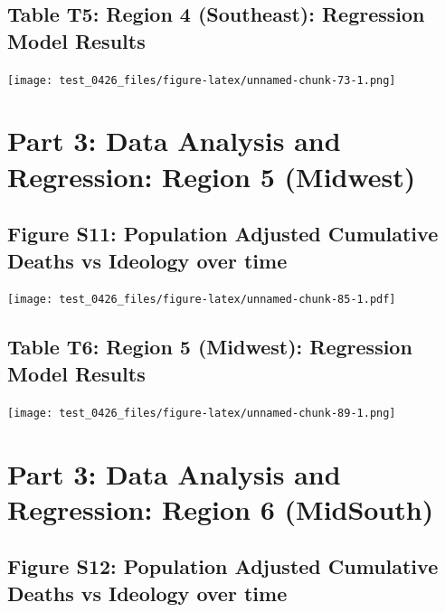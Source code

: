 \documentclass[
]{article}
\begin{document}
\hypertarget{table-t5-region-4-southeast-regression-model-results}{%
\subsection{Table T5: Region 4 (Southeast): Regression Model
Results}\label{table-t5-region-4-southeast-regression-model-results}}

\texttt{[image: test\_0426\_files/figure-latex/unnamed-chunk-73-1.png]}

\newpage

\hypertarget{part-3-data-analysis-and-regression-region-5-midwest}{%
\section{Part 3: Data Analysis and Regression: Region 5
(Midwest)}\label{part-3-data-analysis-and-regression-region-5-midwest}}

\hypertarget{figure-s11-population-adjusted-cumulative-deaths-vs-ideology-over-time}{%
\subsection{Figure S11: Population Adjusted Cumulative Deaths vs
Ideology over
time}\label{figure-s11-population-adjusted-cumulative-deaths-vs-ideology-over-time}}

\texttt{[image: test\_0426\_files/figure-latex/unnamed-chunk-85-1.pdf]}

\hypertarget{table-t6-region-5-midwest-regression-model-results}{%
\subsection{Table T6: Region 5 (Midwest): Regression Model
Results}\label{table-t6-region-5-midwest-regression-model-results}}

\texttt{[image: test\_0426\_files/figure-latex/unnamed-chunk-89-1.png]}

\newpage

\hypertarget{part-3-data-analysis-and-regression-region-6-midsouth}{%
\section{Part 3: Data Analysis and Regression: Region 6
(MidSouth)}\label{part-3-data-analysis-and-regression-region-6-midsouth}}

\hypertarget{figure-s12-population-adjusted-cumulative-deaths-vs-ideology-over-time}{%
\subsection{Figure S12: Population Adjusted Cumulative Deaths vs
Ideology over
time}\label{figure-s12-population-adjusted-cumulative-deaths-vs-ideology-over-time}}
\end{document}
